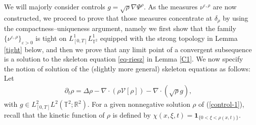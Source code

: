 We will majorly consider controls $g = \sqrt{\rho} \nabla \Psi^{\rho}$. As the measures $\nu^{\varepsilon, \rho}$ are now constructed, we proceed to prove that those measures concentrate at $\delta_{\rho}$ by using the compactness--uniqueness argument, namely we first show that the family $\{\nu^{\varepsilon, \rho}\}_{\varepsilon > 0}$ is tight on $L^1_{[0,T]}L^1_{\mathbb{T}^2}$ equipped with the strong topology in Lemma \ref{tight} below, and then we prove that any limit point of a convergent subsequence is a solution to the skeleton equation \eqref{eq-riesz} in Lemma \ref{C1}.  We now specify the notion of solution of the (slightly more general) skeleton equations as follows: Let
\begin{align}\label{control-1}
\partial_t \rho=\Delta\rho-\nabla\cdot(\rho \mathcal{V}[\rho])-\nabla \cdot\left(\sqrt{\rho} g\right),
\end{align}
with $g \in L^2_{[0,T]}L^2(\mathbb{T}^2;\mathbb{R}^2)$. For a given nonnegative solution $\rho$ of (\ref{control-1}), recall that the kinetic function of $\rho$ is defined by $\chi(x,\xi,t)=\mathbf{1}_{\{0<\xi<\rho(x, t)\}}$.

